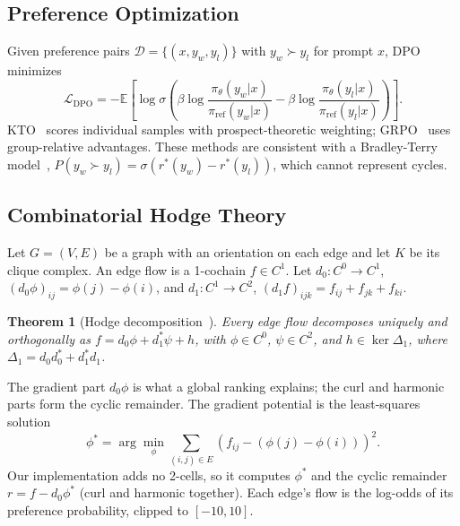 \documentclass{article}
\newtheorem{theorem}{Theorem}
\begin{document}
\subsection{Preference Optimization}

Given preference pairs $\mathcal{D} = \{(x, y_w, y_l)\}$ with $y_w \succ y_l$ for prompt $x$, DPO~\citep{rafailov2023direct} minimizes
\begin{equation}
    \mathcal{L}_\text{DPO} = -\mathbb{E}\left[\log \sigma\left(\beta \log \frac{\pi_\theta(y_w | x)}{\pi_\text{ref}(y_w | x)} - \beta \log \frac{\pi_\theta(y_l | x)}{\pi_\text{ref}(y_l | x)}\right)\right].
\label{eq:dpo}
\end{equation}
KTO~\citep{ethayarajh2024kto} scores individual samples with prospect-theoretic weighting; GRPO~\citep{shao2024deepseekmath} uses group-relative advantages. These methods are consistent with a Bradley-Terry model~\citep{bradley1952rank}, $P(y_w \succ y_l) = \sigma(r^*(y_w) - r^*(y_l))$, which cannot represent cycles.

\subsection{Combinatorial Hodge Theory}
\label{sec:hodge_background}

Let $G = (V, E)$ be a graph with an orientation on each edge and let $K$ be its clique complex. An edge flow is a 1-cochain $f \in C^1$. Let $d_0: C^0 \to C^1$, $(d_0 \phi)_{ij} = \phi(j) - \phi(i)$, and $d_1: C^1 \to C^2$, $(d_1 f)_{ijk} = f_{ij} + f_{jk} + f_{ki}$.

\begin{theorem}[Hodge decomposition~\citep{jiang2011statistical}]
\label{thm:hodge}
Every edge flow decomposes uniquely and orthogonally as $f = d_0 \phi + d_1^{*} \psi + h$, with $\phi \in C^0$, $\psi \in C^2$, and $h \in \ker \Delta_1$, where $\Delta_1 = d_0 d_0^{*} + d_1^{*} d_1$.
\end{theorem}

The gradient part $d_0\phi$ is what a global ranking explains; the curl and harmonic parts form the cyclic remainder. The gradient potential is the least-squares solution
\begin{equation}
    \phi^* = \arg\min_\phi \sum_{(i,j) \in E} \left(f_{ij} - (\phi(j) - \phi(i))\right)^2 .
\end{equation}
Our implementation adds no 2-cells, so it computes $\phi^*$ and the cyclic remainder $r = f - d_0\phi^*$ (curl and harmonic together). Each edge's flow is the log-odds of its preference probability, clipped to $[-10, 10]$.
\end{document}
